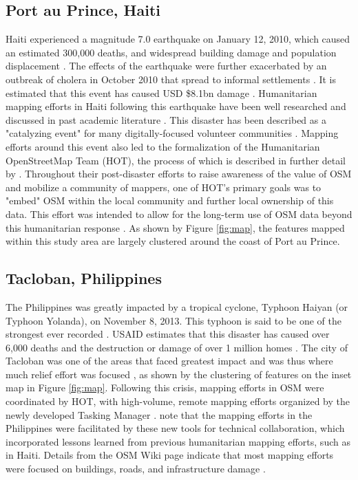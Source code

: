 \subsection{Port au Prince, Haiti}

Haiti experienced a magnitude 7.0 earthquake on January 12, 2010, which caused an estimated 300,000 deaths, and widespread building damage and population displacement \parencite{desroches_overview_2011}. The effects of the earthquake were further exacerbated by an outbreak of cholera in October 2010 that spread to informal settlements \parencite{human_rights_watch_world_2011}. It is estimated that this event has caused USD \$8.1bn damage \parencite{cavallo_estimating_2010}. Humanitarian mapping efforts in Haiti following this earthquake have been well researched and discussed in past academic literature \parencite{zook_volunteered_2010, soden_crowdsourced_2014, palen_success_2015, meier_crisis_2012}. This disaster has been described as a "catalyzing event" for many digitally-focused volunteer communities \parencite[p. 314]{soden_crowdsourced_2014}. Mapping efforts around this event also led to the formalization of the Humanitarian OpenStreetMap Team (HOT), the process of which is described in further detail by \textcite{soden_crowdsourced_2014}. Throughout their post-disaster efforts to raise awareness of the value of OSM and mobilize a community of mappers, one of HOT's primary goals was to "embed" OSM within the local community and further local ownership of this data. This effort was intended to allow for the long-term use of OSM data beyond this humanitarian response \parencite{soden_crowdsourced_2014}. As shown by Figure \ref{fig:map}, the features mapped within this study area are largely clustered around the coast of Port au Prince. 

\subsection{Tacloban, Philippines}

The Philippines was greatly impacted by a tropical cyclone, Typhoon Haiyan (or Typhoon Yolanda), on November 8, 2013. This typhoon is said to be one of the strongest ever recorded \parencite{lum_typhoon_2014}. USAID estimates that this disaster has caused over 6,000 deaths and the destruction or damage of over 1 million homes \parencite{noauthor_typhoon_2014}. The city of Tacloban was one of the areas that faced greatest impact and was thus where much relief effort was focused \parencite{lum_typhoon_2014}, as shown by the clustering of features on the inset map in Figure \ref{fig:map}. Following this crisis, mapping efforts in OSM were coordinated by HOT, with high-volume, remote mapping efforts organized by the newly developed Tasking Manager \parencite{openstreetmap_wiki_wikiproject_2018}. \textcite{palen_success_2015} note that the mapping efforts in the Philippines were facilitated by these new tools for technical collaboration, which incorporated lessons learned from previous humanitarian mapping efforts, such as in Haiti. Details from the OSM Wiki page indicate that most mapping efforts were focused on buildings, roads, and infrastructure damage \parencite{openstreetmap_wiki_wikiproject_2018}.

